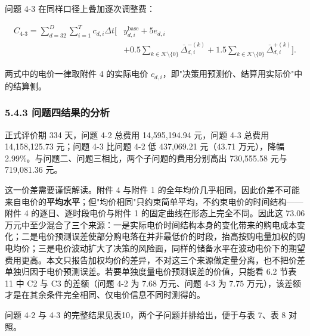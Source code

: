 \documentclass[12pt,a4paper]{ctexart}
\begin{document}
问题 4-3 在同样口径上叠加逐次调整费：

\begin{equation}
\begin{aligned}C_{4\text{-}3}=\sum_{d=32}^{D}\sum_{i=1}^{T}c_{d,i}\Delta t\Bigg[&y_{d,i}^{\mathrm{base}}+5e_{d,i}\\ &+0.5\sum_{k\in\mathcal K\setminus\{0\}}\bar\Delta_{d,i}^{-(k)}+1.5\sum_{k\in\mathcal K\setminus\{0\}}\bar\Delta_{d,i}^{+(k)}\Bigg].\end{aligned}
\end{equation}

两式中的电价一律取附件 4 的实际电价 $c_{d,i}$，即"决策用预测价、结算用实际价"中的结算侧。

\subsubsection*{5.4.3 问题四结果的分析}

正式评价期 334 天，问题 4-2 总费用 14,595,194.94 元，问题 4-3 总费用 14,158,125.73 元；问题 4-3 比问题 4-2 低 437,069.21 元（43.71 万元），降幅 2.99\%。与问题二、问题三相比，两个子问题的费用分别高出 730,555.58 元与 719,081.36 元。

这一价差需要谨慎解读。附件 4 与附件 1 的全年均价几乎相同，因此价差不可能来自电价的\textbf{平均水平}；但"均价相同"只约束简单平均，不约束电价的时间结构——附件 4 的逐日、逐时段电价与附件 1 的固定曲线在形态上完全不同。因此这 73.06 万元中至少混合了三个来源：一是实际电价时间结构本身的变化带来的购电成本变化；二是电价预测误差使部分购电落在并非最低价的时段，抬高按购电量加权的购电均价；三是电价波动扩大了决策的风险面，同样的储备水平在波动电价下的期望费用更高。本文只报告加权均价的差异，不对这三个来源做定量分离，也不把价差单独归因于电价预测误差。若要单独度量电价预测误差的价值，只能看 6.2 节表 11 中 C2 与 C3 的差额（问题 4-2 为 7.68 万元、问题 4-3 为 7.75 万元），该差额才是在其余条件完全相同、仅电价信息不同时测得的。

问题 4-2 与 4-3 的完整结果见表10，两个子问题并排给出，便于与表 7、表 8 对照。
\end{document}
